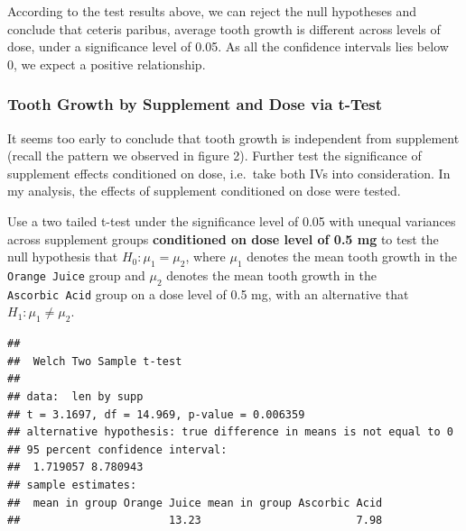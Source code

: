\documentclass[]{article}
\newenvironment{Shaded}{\begin{snugshade}}{\end{snugshade}}
\newcommand{\KeywordTok}[1]{\textcolor[rgb]{0.13,0.29,0.53}{\textbf{#1}}}
\newcommand{\DataTypeTok}[1]{\textcolor[rgb]{0.13,0.29,0.53}{#1}}
\newcommand{\DecValTok}[1]{\textcolor[rgb]{0.00,0.00,0.81}{#1}}
\newcommand{\StringTok}[1]{\textcolor[rgb]{0.31,0.60,0.02}{#1}}
\newcommand{\OperatorTok}[1]{\textcolor[rgb]{0.81,0.36,0.00}{\textbf{#1}}}
\newcommand{\NormalTok}[1]{#1}
\begin{document}
According to the test results above, we can reject the null hypotheses
and conclude that ceteris paribus, average tooth growth is different
across levels of dose, under a significance level of 0.05. As all the
confidence intervals lies below 0, we expect a positive relationship.

\subsubsection{Tooth Growth by Supplement and Dose via
t-Test}\label{tooth-growth-by-supplement-and-dose-via-t-test}

It seems too early to conclude that tooth growth is independent from
supplement (recall the pattern we observed in figure 2). Further test
the significance of supplement effects conditioned on dose, i.e.~take
both IVs into consideration. In my analysis, the effects of supplement
conditioned on dose were tested.

Use a two tailed t-test under the significance level of 0.05 with
unequal variances across supplement groups \textbf{conditioned on dose
level of 0.5 mg} to test the null hypothesis that \(H_0: \mu_1=\mu_2\),
where \(\mu_1\) denotes the mean tooth growth in the
\texttt{Orange\ Juice} group and \(\mu_2\) denotes the mean tooth growth
in the \texttt{Ascorbic\ Acid} group on a dose level of 0.5 mg, with an
alternative that \(H_1: \mu_1\ne\mu_2\).

\begin{Shaded}
\end{Shaded}

\begin{verbatim}
## 
##  Welch Two Sample t-test
## 
## data:  len by supp
## t = 3.1697, df = 14.969, p-value = 0.006359
## alternative hypothesis: true difference in means is not equal to 0
## 95 percent confidence interval:
##  1.719057 8.780943
## sample estimates:
##  mean in group Orange Juice mean in group Ascorbic Acid 
##                       13.23                        7.98
\end{verbatim}
\end{document}
